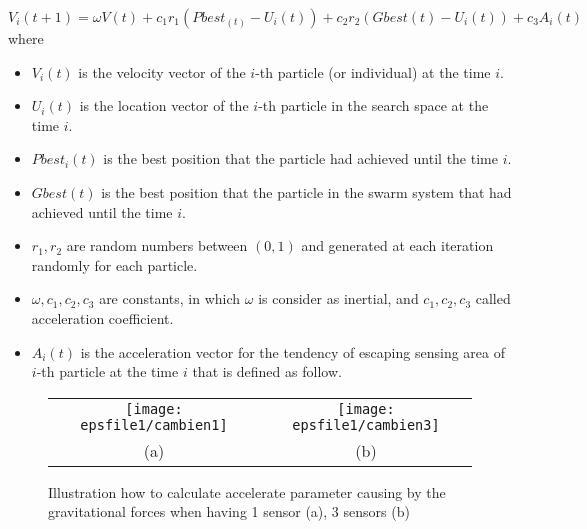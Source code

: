 \documentclass[final]{elsarticle}
\begin{document}
\begin{equation}
\label{eq15}
V_i(t + 1) = \omega V(t) + {c_1}{r_1}(Pbest_(t) - U_i(t)) + {c_2}{r_2}(Gbest(t) - U_i(t)) + {c_3}A_i(t)
\end{equation}
where
\begin{itemize}
	\item  $V_i(t)$ is the velocity vector of the $i$-th particle (or individual) at the time $i$.
	\item  $ {U_i}(t) $ is the location vector of the $i$-th particle in the search space at the time $i$.
	\item $Pbest_i(t)$ is the best position that the particle had achieved until the time $i$.
	\item $Gbest(t)$ is the best position that the particle in the swarm system that had achieved until the time $i$.
	\item ${r_1},{r_2}$ are random numbers between $ (0,1) $ and generated at each iteration randomly for each particle.
	\item $\omega ,{c_1},{c_2},{c_3}$ are constants, in which $ \omega $ is consider as inertial, and ${c_1},{c_2},{c_3}$ called acceleration coefficient.
	\item ${A_i}(t)$ is the acceleration vector for the tendency of escaping sensing area of $i$-th particle at the time $i$ that is defined as follow.
\end{itemize}

\begin{figure*}[h] 
	\centering
	\begin{tabular}{cc}
		\texttt{[image: epsfile1/cambien1]} &\texttt{[image: epsfile1/cambien3]}\\
		(a)&(b)
	\end{tabular}
	\caption{Illustration how to calculate accelerate parameter causing by the gravitational forces when having 1 sensor (a), 3 sensors (b)}
	\label{Fig.8}       %
\end{figure*}
\end{document}

